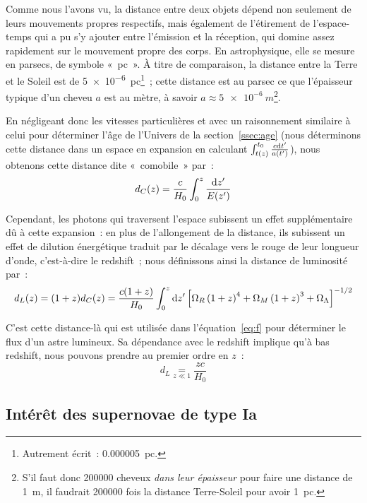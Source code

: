 \documentclass[../main/main.tex]{subfiles}
\begin{document}
Comme nous l'avons vu, la distance entre deux objets dépend non seulement de
leurs mouvements propres respectifs, mais également de l'étirement de
l'espace-temps qui a pu s'y ajouter entre l'émission et la réception, qui domine
assez rapidement sur le mouvement propre des corps. En astrophysique, elle se
mesure en parsecs, de symbole «~pc~». À titre de comparaison, la distance entre
la Terre et le Soleil est de \SI{5e-6}{pc}\footnote{Autrement écrit~:
\SI{0.000005}{pc}.}~; cette distance est au parsec ce que l'épaisseur typique
d'un cheveu $a$ est au mètre, à savoir $a \approx \SI{5e-6}{m}$\footnote{S'il
    faut donc \num{200000} cheveux \textit{dans leur épaisseur} pour faire une
    distance de \SI{1}{m}, il faudrait \num{200000} fois la distance
Terre-Soleil pour avoir \SI{1}{pc}.}.

En négligeant donc les vitesses particulières et avec un raisonnement similaire
à celui pour déterminer l'âge de l'Univers de la section~\ref{ssec:age} (nous
déterminons cette distance dans un espace en expansion en calculant
$\int_{t(z)}^{t_0} \frac{c\mathrm{d} t'}{a(t')}$), nous obtenons cette distance dite
«~comobile~» par~:
\begin{equation}
    d_C(z) = \frac{c}{H_0} \int_{0}^{z} \frac{\mathrm{d} z'}{E(z')}
\end{equation}

Cependant, les photons qui traversent l'espace subissent un effet supplémentaire
dû à cette expansion~: en plus de l'allongement de la distance, ils subissent un
effet de dilution énergétique traduit par le décalage vers le rouge de leur
longueur d'onde, c'est-à-dire le redshift~; nous définissons ainsi la distance
de luminosité par~:
\begin{equation}\label{eq:dl}
    d_L(z) = (1+z)d_C(z) = \frac{c(1+z)}{H_0} \int_{0}^{z} \d z'
    \left[
        \Omega_R \left( 1+z \right)^4 +
        \Omega_M \left( 1+z \right)^3 +
        \Omega_\Lambda %
    \right]^{-1/2}
\end{equation}

C'est cette distance-là qui est utilisée dans l'équation~\ref{eq:f} pour
déterminer le flux d'un astre lumineux. Sa dépendance avec le redshift
implique qu'à bas redshift, nous pouvons prendre au premier ordre en $z$~:
\begin{equation}\label{eq:dlz0}
    d_L \underset{z \ll 1}{=} \frac{zc}{H_0}
\end{equation}

\subsection{Intérêt des supernovae de type Ia}\label{ssec:intsne}
\end{document}
